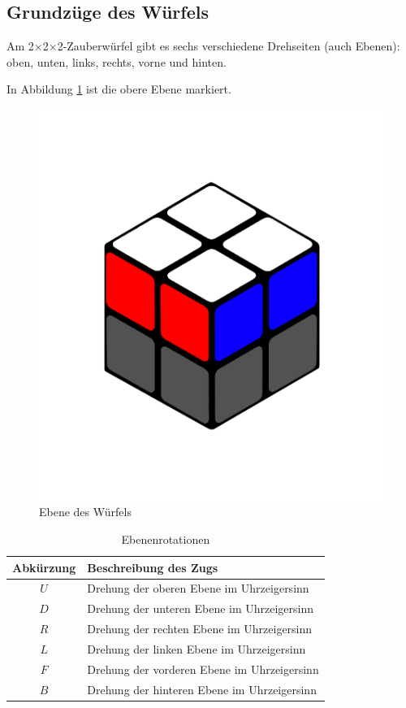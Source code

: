 \documentclass[12pt,a4paper, usenames, dvipsnames]{article}
\newcommand{\Ttwo}{2$\times$2$\times$2-}
\begin{document}
%
%
%
%
%
%
%
%
%
%
%
%
%


\subsection*{Grundzüge des Würfels} 
Am \Ttwo Zauberwürfel gibt es sechs verschiedene Drehseiten (auch Ebenen): oben, unten, links, rechts, vorne und hinten. 

In Abbildung \ref{24} ist die obere Ebene markiert.

\begin{figure}[h]
\centering
\includegraphics[scale=0.1]{ebene.png}
\caption[Ebene des Würfels]{Ebene des Würfels}
\label{24}
\end{figure}

\begin{table}[H]
\centering
\begin{tabular}{|c|l|}
\hline
Abkürzung & Beschreibung des Zugs \\
\hline
\hline
$U$ & Drehung der oberen Ebene im Uhrzeigersinn \\
\hline
$D$ & Drehung der unteren Ebene im Uhrzeigersinn \\
\hline
$R$ & Drehung der rechten Ebene im Uhrzeigersinn \\
\hline
$L$ & Drehung der linken Ebene im Uhrzeigersinn \\%
\hline
$F$ & Drehung der vorderen Ebene im Uhrzeigersinn \\
\hline
$B$ & Drehung der hinteren Ebene im Uhrzeigersinn \\
\hline
\end{tabular} 
\caption[Ebenenrotationen]{Ebenenrotationen}
\end{table}
\end{document}
